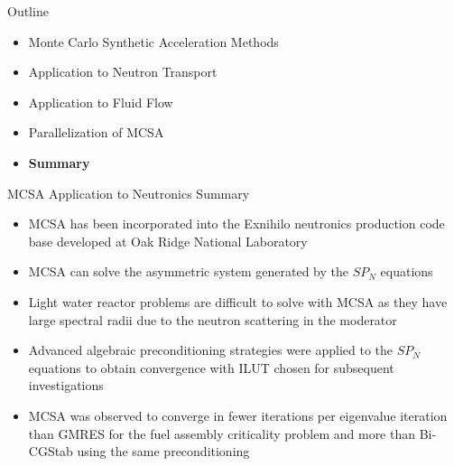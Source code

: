 \documentclass{beamer}
\begin{document}
\begin{frame}{Outline}

  \begin{itemize}
  \item Monte Carlo Synthetic Acceleration Methods
    \bigskip
  \item Application to Neutron Transport
    \bigskip
  \item Application to Fluid Flow
    \bigskip
  \item Parallelization of MCSA
    \bigskip
  \item \textbf{Summary}
  \end{itemize}

\end{frame}

\begin{frame}{MCSA Application to Neutronics Summary}

  \small{
    \begin{itemize}
    \item MCSA has been incorporated into the Exnihilo neutronics
      production code base developed at Oak Ridge National Laboratory
      \medskip
    \item MCSA can solve the asymmetric system generated by the $SP_N$
      equations
      \medskip
    \item Light water reactor problems are difficult to solve with MCSA as
      they have large spectral radii due to the neutron scattering in the
      moderator
      \medskip
    \item Advanced algebraic preconditioning strategies were applied to
      the $SP_N$ equations to obtain convergence with ILUT chosen for
      subsequent investigations
      \medskip
    \item MCSA was observed to converge in fewer iterations per eigenvalue
      iteration than GMRES for the fuel assembly criticality problem and
      more than Bi-CGStab using the same preconditioning
    \end{itemize}
  }

\end{frame}
\end{document}
